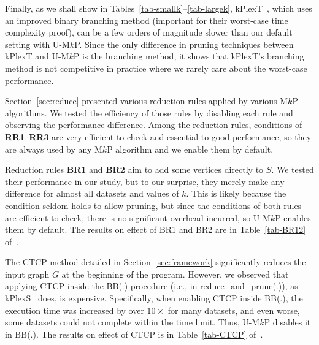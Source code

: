 \documentclass[sigconf, nonacm]{acmart}
\begin{document}
Finally, as we shall show in Tables~\ref{tab-smallk}--\ref{tab-largek}, kPlexT~\cite{kPlexT}, which uses an improved binary branching method (important for their worst-case time complexity proof), can be a few orders of magnitude slower than our default setting with U-M$k$P. Since the only difference in pruning techniques between kPlexT and U-M$k$P is the branching method, it shows that kPlexT's branching method is not competitive in practice where we rarely care about the worst-case performance.

\vspace{1mm}
Section~\ref{sec:reduce} presented various reduction rules applied by various M$k$P algorithms. We tested the efficiency of those rules by disabling each rule and observing the performance difference. Among the reduction rules, conditions of \textbf{RR1}--\textbf{RR3} are very efficient to check and essential to good performance, so they are always used by any M$k$P algorithm and we enable them by default. 

Reduction rules \textbf{BR1} and \textbf{BR2} aim to add some vertices directly to $S$. We tested their performance in our study, but to our surprise, they merely make any difference for almost all datasets and values of $k$. This is likely because the condition seldom holds to allow pruning, but since the conditions of both rules are efficient to check, there is no significant overhead incurred, so U-M$k$P enables them by default. The results on effect of BR1 and BR2 are in Table~\ref{tab-BR12} of~\cite{tech_report}.

The CTCP method detailed in Section~\ref{sec:framework} significantly reduces the input graph $G$ at the beginning of the program. %
However, we observed that applying CTCP inside the BB(.) procedure (i.e., in reduce\_and\_prune(.)), as kPlexS~\cite{kPlexS} does, is expensive. Specifically, when enabling CTCP inside BB(.), the execution time was increased by over $10\times$ for many datasets, and even worse, some datasets could not complete within the time limit. Thus, U-M$k$P disables it in BB(.). The results on effect of CTCP is in Table~\ref{tab-CTCP} of~\cite{tech_report}.
\end{document}
